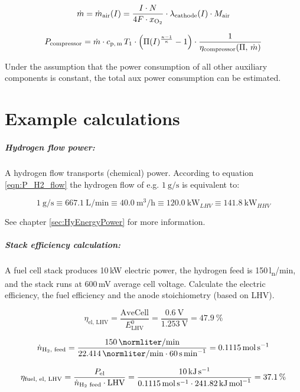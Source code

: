 \documentclass[11pt,a4paper,english,twoside]{scrreprt}
\begin{document}
\[
\dot{m}=\dot{m}_\text{air}(I) = \frac{I\cdot N}{4F\cdot x_{\ce{O2}}} \cdot \lambda_\text{cathode}(I) \cdot M_\text{air}
\]

\[
P_\text{compressor} = \dot{m} \cdot c_\text{p,\,m} \, T_1 \cdot \left(\Pi(I) ^{\frac{\kappa -1}{\kappa } } -1\right) \cdot \frac{1}{\eta_\text{compressor}(\Pi,\,\dot{m})}
\]

Under the assumption that the power consumption of all other auxiliary components is constant, the total aux power consumption can be estimated.


\chapter{Example calculations}

\paragraph {Hydrogen flow power:}

A hydrogen flow transports (chemical) power. According to equation \ref{eqn:P_H2_flow} the hydrogen flow of e.g. $\SI{1}{\gram\per\second}$ is equivalent to:

\[
\SI{1}{\gram\per\second} \equiv \SI{667.1}{\liter\per\minute} \equiv \SI{40.0}{\cubic\meter\per\hour} \equiv \SI{120.0}{\kilo\watt_{LHV}} \equiv \SI{141.8}{\kilo\watt_{HHV}}
\]

See chapter \ref{sec:HyEnergyPower} for more information.



\paragraph {Stack efficiency calculation:}

A fuel cell stack produces 10\,kW electric power, the hydrogen feed is 150\,l\textsubscript{n}/min, and the stack runs at 600\,mV average cell voltage. Calculate the electric efficiency, the fuel efficiency and the anode stoichiometry (based on LHV).

\[
\eta_\text{el, LHV} =\frac{\text{AveCell}}{E^0_\text{LHV} } =\frac{\SI{0.6}{\volt}}{\SI{1.253}{\volt}} = \SI{47.9}{\percent}
\]

\[
\dot{n}_\text{\ce{H2}, feed} = \frac{\SI{150}{\normliter\per\minute}}{\SI{22.414}{\normliter\per\minute} \cdot \SI{60}{\second\per\minute}} = \SI{0.1115}{\mole\per\second}
\]

\[
\eta_\text{fuel, el, LHV} =\frac{P_\text{el} }{\dot{n}_\text{\ce{H2} feed} \cdot \text{LHV}} = \frac{\SI{10}{\kilo\joule\per\second}}{\SI{0.1115}{\mole\per\second} \cdot \SI{241.82}{\kilo\joule\per\mole}} = \SI{37.1}{\percent}
\]
\end{document}

